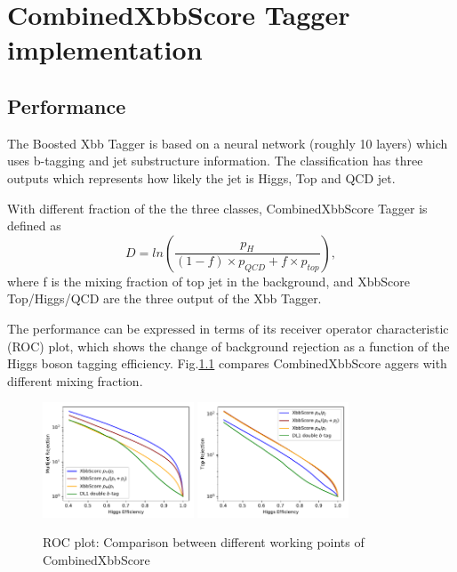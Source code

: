 \chapter{CombinedXbbScore Tagger implementation}

\section{Performance}

\par The Boosted Xbb Tagger is based on a neural network (roughly 10 layers) which uses b-tagging and jet substructure information. 
The classification has three outputs which represents how likely the jet is Higgs, Top and QCD jet.  

\par With different fraction of the the three classes, CombinedXbbScore Tagger is defined as
\begin{equation}
D=ln(\frac{p_H}{(1-f)\times p_{QCD}+f\times p_{top}}),
\end{equation}
where f is the mixing fraction of top jet in the background, and XbbScore Top/Higgs/QCD are the three output of the Xbb Tagger.

\par The performance can be expressed in terms of its receiver operator characteristic (ROC) plot, which shows the change of background rejection as a function of the Higgs boson tagging efficiency. 
Fig.\ref{fig:roctop} compares CombinedXbbScore aggers with different mixing fraction.

\begin{figure}[h]
    \centering
    \includegraphics[width=0.4\textwidth]{appendices/figures/roc_multijet.pdf}
    \includegraphics[width=0.4\textwidth]{appendices/figures/roc_top.pdf}
    \caption{ ROC plot: Comparison between different working points of CombinedXbbScore}
    \label{fig:roctop}
\end{figure}

